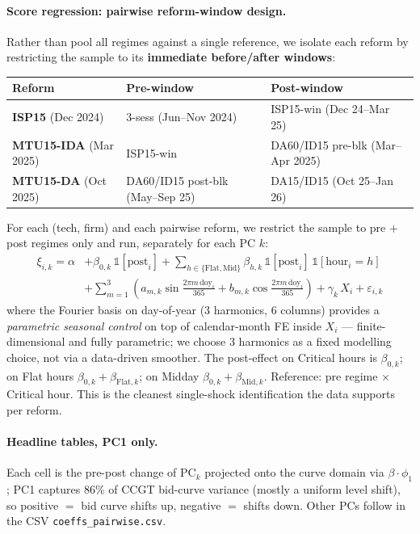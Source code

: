 \documentclass[11pt,a4paper]{article}
\newcommand{\code}[1]{\nolinkurl{#1}}
\begin{document}
\paragraph{Score regression: pairwise reform-window design.} Rather than pool all regimes against a single reference, we isolate each reform by restricting the sample to its \textbf{immediate before/after windows}:
\begin{center}\scriptsize
\setlength{\tabcolsep}{4pt}
\begin{tabular}{l l l}
\toprule
Reform & Pre-window & Post-window \\
\midrule
\textbf{ISP15} (Dec 2024) & 3-sess (Jun--Nov 2024) & ISP15-win (Dec 24--Mar 25) \\
\textbf{MTU15-IDA} (Mar 2025) & ISP15-win & DA60/ID15 pre-blk (Mar--Apr 2025) \\
\textbf{MTU15-DA} (Oct 2025) & DA60/ID15 post-blk (May--Sep 25) & DA15/ID15 (Oct 25--Jan 26) \\
\bottomrule
\end{tabular}
\end{center}
For each (tech, firm) and each pairwise reform, we restrict the sample to pre $+$ post regimes only and run, separately for each PC $k$:
\begin{align*}
\xi_{i,k} = \alpha &+ \beta_{0,k}\, \mathds{1}[\text{post}_i]
                    + \!\sum_{h \in \{\text{Flat}, \text{Mid}\}}\! \beta_{h,k}\, \mathds{1}[\text{post}_i]\,\mathds{1}[\text{hour}_i = h] \\
                   &+ \!\sum_{m=1}^{3}\! \left(a_{m,k} \sin\!\tfrac{2\pi m\, \text{doy}_i}{365} + b_{m,k} \cos\!\tfrac{2\pi m\, \text{doy}_i}{365}\right) + \gamma_k\, X_i + \varepsilon_{i,k}
\end{align*}
where the Fourier basis on day-of-year (3 harmonics, 6 columns) provides a \emph{parametric seasonal control} on top of calendar-month FE inside $X_i$ --- finite-dimensional and fully parametric; we choose 3 harmonics as a fixed modelling choice, not via a data-driven smoother. The post-effect on Critical hours is $\beta_{0, k}$; on Flat hours $\beta_{0, k} + \beta_{\text{Flat}, k}$; on Midday $\beta_{0, k} + \beta_{\text{Mid}, k}$. Reference: pre regime $\times$ Critical hour. This is the cleanest single-shock identification the data supports per reform.

\paragraph{Headline tables, PC1 only.} Each cell is the pre-post change of PC$_k$ projected onto the curve domain via $\beta \cdot \phi_1$; PC1 captures 86\% of CCGT bid-curve variance (mostly a uniform level shift), so positive $=$ bid curve shifts up, negative $=$ shifts down. Other PCs follow in the CSV \code{coeffs\_pairwise.csv}.
\end{document}
